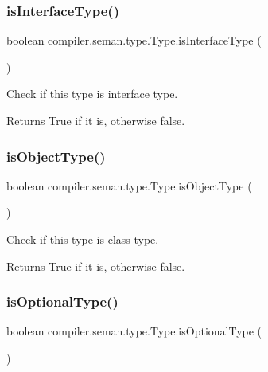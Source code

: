\subsubsection{\texorpdfstring{is\+Interface\+Type()}{isInterfaceType()}}
{\footnotesize\ttfamily boolean compiler.\+seman.\+type.\+Type.\+is\+Interface\+Type (\begin{DoxyParamCaption}{ }\end{DoxyParamCaption})}

Check if this type is interface type. \begin{DoxyReturn}{Returns}
True if it is, otherwise false. 
\end{DoxyReturn}
\mbox{\label{classcompiler_1_1seman_1_1type_1_1_type_a2d595b0bcd8e172fc13a23f9e76900aa}} 
\subsubsection{\texorpdfstring{is\+Object\+Type()}{isObjectType()}}
{\footnotesize\ttfamily boolean compiler.\+seman.\+type.\+Type.\+is\+Object\+Type (\begin{DoxyParamCaption}{ }\end{DoxyParamCaption})}

Check if this type is class type. \begin{DoxyReturn}{Returns}
True if it is, otherwise false. 
\end{DoxyReturn}
\mbox{\label{classcompiler_1_1seman_1_1type_1_1_type_a6087e56ed1b2049aca78971bf1877dc9}} 
\subsubsection{\texorpdfstring{is\+Optional\+Type()}{isOptionalType()}}
{\footnotesize\ttfamily boolean compiler.\+seman.\+type.\+Type.\+is\+Optional\+Type (\begin{DoxyParamCaption}{ }\end{DoxyParamCaption})}

